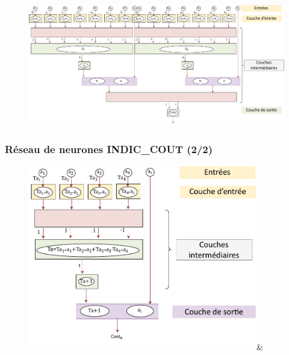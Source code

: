 \documentclass[hyperref={bookmarks=false},aspectratio=169]{beamer}
\begin{document}
\begin{frame}
\begin{figure}[H]
	\centering
		\includegraphics[width=13.5cm]{figures/slide_im_2_PROD_cost_value.pdf}
\end{figure}

\end{frame}

\begin{frame}
 \addtocounter{framenumber}{-1}
\frametitle{Réseau de neurones INDIC\_COUT (2/2) }
\begin{figure}[H]
	\centering
		\includegraphics[width=10cm]{figures/slide_im_1_PROD_cost_value.pdf}&
\end{figure}

\end{frame}
\end{document}

